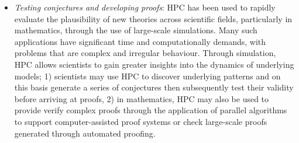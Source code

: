 \documentclass[10pt]{article}[draft]
\begin{document}
\begin{itemize}
	
\item \emph{Testing conjectures and developing proofs}: HPC has been used to rapidly evaluate the plausibility of new theories across scientific fields, particularly in mathematics, through the use of large-scale simulations. Many such applications have significant time and computationally demands, with problems that are complex and irregular behaviour. Through simulation, HPC allows scientists  to gain greater insights into the dynamics of underlying models; 1) scientists may use HPC to discover underlying patterns and on this basis generate a series of conjectures then subsequently test their validity before arriving at proofs, 2) in mathematics, HPC may also be used to provide verify complex proofs through the  application of parallel algorithms to support computer-assisted proof systems or check large-scale proofs generated through automated proofing. 
	
	
	

\end{itemize}
\end{document}
